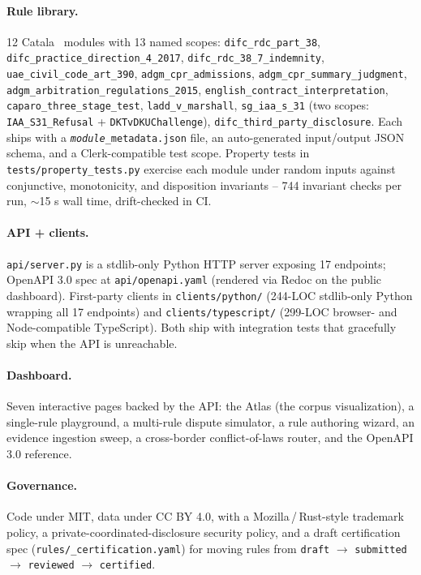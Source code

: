 \documentclass[11pt,letterpaper]{article}
\begin{document}
\paragraph{Rule library.} 12 Catala~\cite{catala} modules with 13 named scopes: \texttt{difc\_rdc\_part\_38}, \texttt{difc\_practice\_direction\_4\_2017}, \texttt{difc\_rdc\_38\_7\_indemnity}, \texttt{uae\_civil\_code\_art\_390}, \texttt{adgm\_cpr\_admissions}, \texttt{adgm\_cpr\_summary\_judgment}, \texttt{adgm\_arbitration\_regulations\_2015}, \texttt{english\_contract\_interpretation}, \texttt{caparo\_three\_stage\_test}, \texttt{ladd\_v\_marshall}, \texttt{sg\_iaa\_s\_31} (two scopes: \texttt{IAA\_S31\_Refusal} + \texttt{DKTvDKUChallenge}), \texttt{difc\_third\_party\_disclosure}. Each ships with a \texttt{\textit{module}\_metadata.json} file, an auto-generated input/output JSON schema, and a Clerk-compatible test scope. Property tests in \texttt{tests/property\_tests.py} exercise each module under random inputs against conjunctive, monotonicity, and disposition invariants -- 744 invariant checks per run, $\sim$15 s wall time, drift-checked in CI.

\paragraph{API + clients.} \texttt{api/server.py} is a stdlib-only Python HTTP server exposing 17 endpoints; OpenAPI 3.0 spec at \texttt{api/openapi.yaml} (rendered via Redoc on the public dashboard). First-party clients in \texttt{clients/python/} (244-LOC stdlib-only Python wrapping all 17 endpoints) and \texttt{clients/typescript/} (299-LOC browser- and Node-compatible TypeScript). Both ship with integration tests that gracefully skip when the API is unreachable.

\paragraph{Dashboard.} Seven interactive pages backed by the API: the Atlas (the corpus visualization), a single-rule playground, a multi-rule dispute simulator, a rule authoring wizard, an evidence ingestion sweep, a cross-border conflict-of-laws router, and the OpenAPI 3.0 reference.

\paragraph{Governance.} Code under MIT, data under CC BY 4.0, with a Mozilla\,/\,Rust-style trademark policy, a private-coordinated-disclosure security policy, and a draft certification spec (\texttt{rules/\_certification.yaml}) for moving rules from \texttt{draft} $\to$ \texttt{submitted} $\to$ \texttt{reviewed} $\to$ \texttt{certified}.
\end{document}
